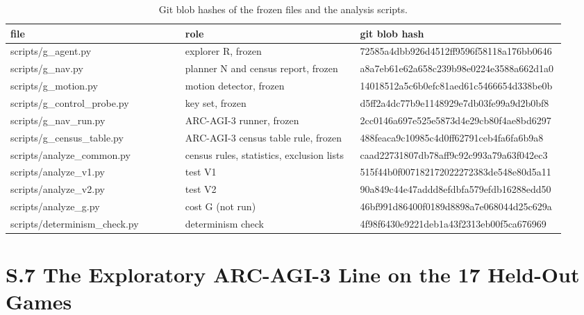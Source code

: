 \documentclass[journal,onecolumn]{IEEEtran}
\begin{document}
\begin{table}[!htbp]
\renewcommand{\thetable}{S6}
\caption{Git blob hashes of the frozen files and the analysis scripts.}
\centering
\footnotesize
\renewcommand{\arraystretch}{1.15}
\setlength{\tabcolsep}{4pt}
\begin{tabular}{>{\raggedright\arraybackslash}p{0.311\linewidth}>{\raggedright\arraybackslash}p{0.311\linewidth}>{\raggedright\arraybackslash}p{0.311\linewidth}}
\hline
\textbf{file} & \textbf{role} & \textbf{git blob hash} \\ \hline
scripts/g\_agent.py & explorer R, frozen & 72585a4dbb926d4512ff9596f58118a176bb0646 \\
scripts/g\_nav.py & planner N and census report, frozen & a8a7eb61e62a658c239b98e0224e3588a662d1a0 \\
scripts/g\_motion.py & motion detector, frozen & 14018512a5c6b0efc81aed61c5466654d338be0b \\
scripts/g\_control\_probe.py & key set, frozen & d5ff2a4dc77b9e1148929e7db03fe99a9d2b0bf8 \\
scripts/g\_nav\_run.py & ARC-AGI-3 runner, frozen & 2cc0146a697e525e5873d4e29cb80f4ae8bd6297 \\
scripts/g\_census\_table.py & ARC-AGI-3 census table rule, frozen & 488feaca9c10985c4d0ff62791ceb4fa6fa6b9a8 \\
scripts/analyze\_common.py & census rules, statistics, exclusion lists & caad22731807db78aff9c92c993a79a63f042ec3 \\
scripts/analyze\_v1.py & test V1 & 515f44b0f007182172022272383de548e80d5a11 \\
scripts/analyze\_v2.py & test V2 & 90a849c44e47addd8efdbfa579efdb16288edd50 \\
scripts/analyze\_g.py & cost G (not run) & 46bf991d86400f0189d8898a7e068044d25c629a \\
scripts/determinism\_check.py & determinism check & 4f98f6430e9221deb1a43f2313eb00f5ca676969 \\
\hline
\end{tabular}
\end{table}

\section*{S.7 The Exploratory ARC-AGI-3 Line on the 17 Held-Out
Games}\label{s.7-the-exploratory-arc-agi-3-line-on-the-17-held-out-games}
\end{document}
